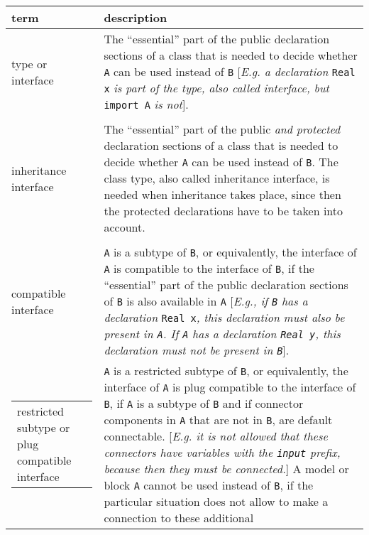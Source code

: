 \begin{longtable}{|p{4cm}|p{8cm}|}
\hline \endhead
\textbf{term} & \textbf{description}\\ \hline
type or interface
& The ``essential'' part of the public declaration sections of a class
that is needed to decide whether \lstinline!A! can be used instead of \lstinline!B!
{[}\emph{E.g. a declaration} \lstinline!Real x! \emph{is part of the type, also
called interface, but} \lstinline!import A! \emph{is not}{]}.
\\ \hline
\begin{tabular}{@{}p{4cm}@{}}
class type or\\
inheritance interface
\end{tabular}
&
The ``essential'' part of the public \emph{and protected} declaration
sections of a class that is needed to decide whether \lstinline!A! can be used
instead of \lstinline!B!. The class type, also called inheritance interface, is
needed when inheritance takes place, since then the protected
declarations have to be taken into account.\\ \hline
\begin{tabular}{@{}p{4cm}@{}}
subtype or\\
compatible interface
\end{tabular} &
\lstinline!A! is a subtype of \lstinline!B!, or equivalently, the interface of \lstinline!A! is compatible
to the interface of \lstinline!B!, if the ``essential'' part of the public
declaration sections of \lstinline!B! is also available in \lstinline!A! {[}\emph{E.g., if \lstinline!B! has
a declaration} \lstinline!Real x!\emph{, this declaration must also be present
in \lstinline!A!. If \lstinline!A! has a declaration \lstinline!Real y!, this declaration must not be
present in \lstinline!B!}{]}.\\ \hline
\begin{tabular}{@{}p{4cm}@{}}
restricted subtype or plug compatible interface
\end{tabular} &
\lstinline!A! is a restricted subtype of \lstinline!B!, or equivalently, the interface of \lstinline!A! is
plug compatible to the interface of \lstinline!B!, if \lstinline!A! is a subtype of \lstinline!B! and if
connector components in \lstinline!A! that are not in \lstinline!B!, are default connectable.
{[}\emph{E.g. it is not allowed that these connectors have variables
with the \lstinline!input! prefix, because then they must be connected.}{]}
A model or block \lstinline!A! cannot be used instead of \lstinline!B!, if the particular
situation does not allow to make a connection to these additional

\end{longtable}
